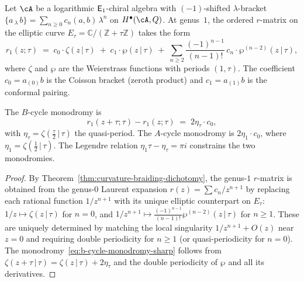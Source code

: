 \begin{theorem}
\label{thm:elliptic-spectral-dichotomy}
Let $\cA$ be a logarithmic $\mathsf{E}_1$-chiral algebra with
$(-1)$-shifted $\lambda$-bracket
$\{a\,{}_\lambda\,b\}=\sum_{n\ge 0}c_n(a,b)\,\lambda^n$
on $H^\bullet(\cA,Q)$.
At genus~$1$, the ordered $r$-matrix on the elliptic curve
$E_\tau=\mathbb{C}/(\mathbb{Z}+\tau\mathbb{Z})$ takes the form
\begin{equation}\label{eq:elliptic-r-dichotomy}
r_1(z;\tau)
\;=\;
c_0\cdot\zeta(z\,|\,\tau)
\;+\;
c_1\cdot\wp(z\,|\,\tau)
\;+\;
\sum_{n\ge 2}
 \frac{(-1)^{n-1}}{(n-1)!}\,
 c_n\cdot\wp^{(n-2)}(z\,|\,\tau),
\end{equation}
where $\zeta$ and $\wp$ are the Weierstrass functions with
periods $(1,\tau)$. The coefficient $c_0=a_{(0)}b$ is the
Coisson bracket \textup{(}zeroth product\textup{)} and
$c_1=a_{(1)}b$ is the conformal pairing.

The $B$-cycle monodromy is
\begin{equation}\label{eq:b-cycle-monodromy-sharp}
r_1(z+\tau;\tau) - r_1(z;\tau) \;=\; 2\eta_\tau\cdot c_0,
\end{equation}
with $\eta_\tau=\zeta(\tfrac{\tau}{2}\,|\,\tau)$ the
quasi-period. The $A$-cycle monodromy is $2\eta_1\cdot c_0$,
where $\eta_1=\zeta(\tfrac{1}{2}\,|\,\tau)$. The Legendre
relation $\eta_1\tau-\eta_\tau=\pi i$ constrains the
two monodromies.
\end{theorem}

\begin{proof}
By Theorem~\ref{thm:curvature-braiding-dichotomy}, the
genus-$1$ $r$-matrix is obtained from the genus-$0$ Laurent
expansion $r(z)=\sum c_n/z^{n+1}$ by replacing each rational
function $1/z^{n+1}$ with its unique elliptic counterpart on
$E_\tau$: $1/z\mapsto\zeta(z\,|\,\tau)$ for $n=0$, and
$1/z^{n+1}\mapsto\frac{(-1)^{n-1}}{(n-1)!}\wp^{(n-2)}(z\,|\,\tau)$
for $n\ge 1$. These are uniquely determined by matching the
local singularity $1/z^{n+1}+O(z)$ near $z=0$ and requiring
double periodicity for $n\ge 1$ (or quasi-periodicity for $n=0$).
The monodromy~\eqref{eq:b-cycle-monodromy-sharp} follows from
$\zeta(z+\tau\,|\,\tau)=\zeta(z\,|\,\tau)+2\eta_\tau$ and the
double periodicity of $\wp$ and all its derivatives.
\end{proof}

